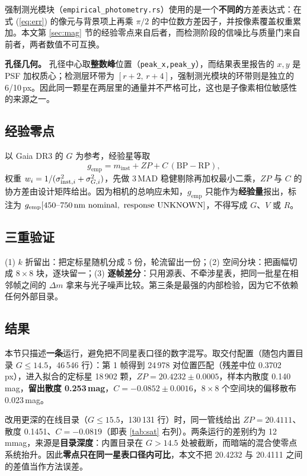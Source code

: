 \documentclass[11pt,a4paper]{ctexart}
\newcommand{\gemp}{\ensuremath{g_{\mathrm{emp}}}}
\newcommand{\minst}{\ensuremath{m_{\mathrm{inst}}}}
\begin{document}
强制测光模块（\texttt{empirical\_photometry.rs}）使用的是一个\textbf{不同的}方差表达式：在式 (\ref{eq:err}) 的像元与背景项上再乘 $\pi/2$ 的中位数方差因子，并按像素覆盖权重累加。本文第 \ref{sec:mag} 节的经验零点来自后者，而检测阶段的信噪比与质量门来自前者，两者数值不可互换。

\noindent\textbf{孔径几何。} 孔径中心取\textbf{整数峰}位置（\texttt{peak\_x,peak\_y}），而结果表里报告的 $x,y$ 是 PSF 加权质心；检测层环带为 $[r+2,\,r+4]$，强制测光模块的环带则是独立的 6/10\,px。因此同一颗星在两层里的通量并不严格可比，这也是子像素相位敏感性的来源之一。

\subsection{经验零点}
以 Gaia DR3 的 $G$ 为参考，经验星等取
\begin{equation}
\gemp=\minst+ZP+C\,(\mathrm{BP}-\mathrm{RP}),
\label{eq:zp}
\end{equation}
权重 $w_i=1/(\sigma_{{\rm inst},i}^2+\sigma_{G,i}^2)$，先做 3\,MAD 稳健剔除再加权最小二乘，$ZP$ 与 $C$ 的协方差由设计矩阵给出。因为相机的总响应未知，$\gemp$ 只能作为\textbf{经验量}报出，标注为 $\gemp[450\text{--}750\,{\rm nm\ nominal},\ {\rm response\ UNKNOWN}]$，不得写成 $G$、$V$ 或 $R$。

\subsection{三重验证}
(1) $k$ 折留出：把定标星随机分成 5 份，轮流留出一份；(2) 空间分块：把画幅切成 $8\times8$ 块，逐块留一；(3) \textbf{逐帧差分}：只用源表、不牵涉星表，把同一批星在相邻帧之间的 $\Delta m$ 拿来与光子噪声比较。第三条是最强的内部检验，因为它不依赖任何外部目录。

\subsection{结果}
本节只描述\textbf{一条}运行，避免把不同星表口径的数字混写。取交付配置（随包内置目录 $G\le14.5$，46\,546 行）：第 1 帧得到 24\,978 对位置匹配（残差中位 0.3702\,px），进入拟合的定标星 18\,902 颗，$ZP=20.4232\pm0.0005$，样本内散度 0.140\,mag，\textbf{留出散度 0.253\,mag}，$C=-0.0852\pm0.0016$，$8\times8$ 个空间块的偏移散布 0.023\,mag。

改用更深的在线目录（$G\le15.5$，130\,131 行）时，同一管线给出 $ZP=20.4111$、散度 0.1451、$C=-0.0819$（即表 \ref{tab:sat} 右列）。两条运行的差别约为 12\,mmag，来源是\textbf{目录深度}：内置目录在 $G>14.5$ 处被截断，而暗端的混合使零点系统抬升。因此\textbf{零点只在同一星表口径内可比}，本文不把 20.4232 与 20.4111 之间的差值当作方法误差。
\end{document}
